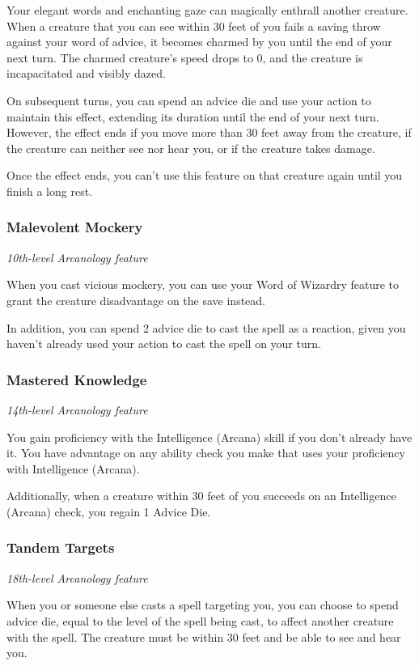 \documentclass[letterpaper,openany,twoside,twocolumn]{book}
\begin{document}
	Your elegant words and enchanting gaze can magically enthrall another creature. When a creature that you can see within 30 feet of you fails a saving throw against your word of advice, it becomes charmed by you until the end of your next turn. The charmed creature’s speed drops to 0, and the creature is incapacitated and visibly dazed.
	
	On subsequent turns, you can spend an advice die and use your action to maintain this effect, extending its duration until the end of your next turn. However, the effect ends if you move more than 30 feet away from the creature, if the creature can neither see nor hear you, or if the creature takes damage.
	
	Once the effect ends, you can’t use this feature on that creature again until you finish a long rest.
	
	\subsubsection*{Malevolent Mockery}
	\textnormal{\textit{10th-level Arcanology feature}}
	
	When you cast vicious mockery, you can use your Word of Wizardry feature to grant the creature disadvantage on the save instead.
	
	In addition, you can spend 2 advice die to cast the spell as a reaction, given you haven't already used your action to cast the spell on your turn.
	
	\subsubsection*{Mastered Knowledge}
	\textnormal{\textit{14th-level Arcanology feature}}
	
	You gain proficiency with the Intelligence (Arcana) skill if you don’t already have it. You have advantage on any ability check you make that uses your proficiency with Intelligence (Arcana).
	
	Additionally, when a creature within 30 feet of you succeeds on an Intelligence (Arcana) check, you regain 1 Advice Die.
	
	\subsubsection*{Tandem Targets}
	\textnormal{\textit{18th-level Arcanology feature}}
	
	When you or someone else casts a spell targeting you, you can choose to spend advice die, equal to the level of the spell being cast, to affect another creature with the spell. The creature must be within 30 feet and be able to see and hear you.
	
\end{document}

